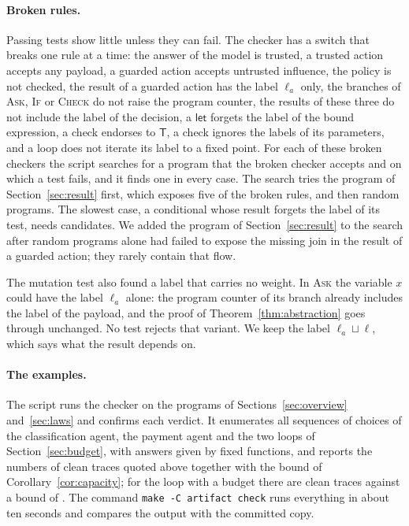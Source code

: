 \documentclass[acmsmall,nonacm,screen]{acmart}
\newcommand{\kw}[1]{\mathsf{#1}}
\newcommand{\T}{\kw{T}}
\begin{document}
\paragraph{Broken rules.} Passing tests show little unless they can fail. The checker has a
switch that breaks one rule at a time: the answer of the model is trusted, a trusted action
accepts any payload, a guarded action accepts untrusted influence, the policy is not
checked, the result of a guarded action has the label $\ell_a$ only, the branches of
\textsc{Ask}, \textsc{If} or \textsc{Check} do not raise the program counter, the results of
these three do not include the label of the decision, a $\kw{let}$ forgets the label of the
bound expression, a check endorses to $\T$, a check ignores the labels of its parameters,
and a loop does not iterate its label to a fixed point. For each of these \exRules{} broken
checkers the script searches for a program that the broken checker accepts and on which a
test fails, and it finds one in every case. The search tries the program of
Section~\ref{sec:result} first, which exposes five of the broken rules, and then random
programs. The slowest case, a conditional whose result forgets the label of its test, needs
\exSlowest{} candidates. We added the program of Section~\ref{sec:result} to the search
after random programs alone had failed to expose the missing join in the result of a guarded
action; they rarely contain that flow.

The mutation test also found a label that carries no weight. In \textsc{Ask} the variable
$x$ could have the label $\ell_a$ alone: the program counter of its branch already includes
the label of the payload, and the proof of Theorem~\ref{thm:abstraction} goes through
unchanged. No test rejects that variant. We keep the label $\ell_a \sqcup \ell$, which says
what the result depends on.

\paragraph{The examples.} The script runs the checker on the programs of
Sections~\ref{sec:overview} and~\ref{sec:laws} and confirms each verdict. It enumerates all
sequences of choices of the classification agent, the payment agent and the two loops of
Section~\ref{sec:budget}, with answers given by fixed functions, and reports the numbers of
clean traces quoted above together with the bound of Corollary~\ref{cor:capacity}; for the
loop with a budget there are \exTracesWith{} clean traces against a bound of \exBoundWith.
The command \texttt{make -C artifact check} runs everything in about ten seconds and
compares the output with the committed copy.
\end{document}
